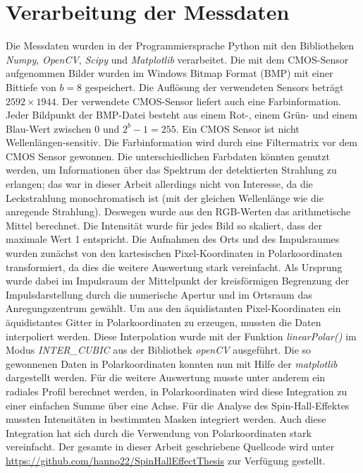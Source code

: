 \documentclass[a4paper, titlepage,  ngerman, fullpage]{book}
\begin{document}
	\section{Verarbeitung der Messdaten}
	\label{sec:polar_calculation}
	Die Messdaten wurden in der Programmiersprache Python mit den Bibliotheken \textit{Numpy}, \textit{OpenCV}, \textit{Scipy} und \textit{Matplotlib} verarbeitet. Die mit dem CMOS-Sensor aufgenommen Bilder wurden im Windows Bitmap Format (BMP) mit einer Bittiefe von  $b = 8$ gespeichert. Die Auflösung der verwendeten Sensors beträgt $2592 \times 1944$. Der verwendete CMOS-Sensor liefert auch eine Farbinformation. Jeder Bildpunkt der BMP-Datei besteht aus einem Rot-, einem Grün- und einem Blau-Wert zwischen $0$ und $2^b - 1= 255$. Ein CMOS Sensor ist nicht Wellenlängen-sensitiv. Die Farbinformation wird durch eine Filtermatrix vor dem CMOS Sensor gewonnen. Die unterschiedlichen Farbdaten könnten genutzt werden, um Informationen über das Spektrum der detektierten Strahlung zu erlangen; das war in dieser Arbeit allerdings nicht von Interesse, da die Leckstrahlung monochromatisch ist (mit der gleichen Wellenlänge wie die anregende Strahlung). Deswegen wurde aus den RGB-Werten das arithmetische Mittel berechnet. Die Intensität wurde für jedes Bild so skaliert, dass der maximale Wert 1 entspricht. Die Aufnahmen des Orts und des Impulsraumes wurden zunächst von den kartesischen Pixel-Koordinaten in Polarkoordinaten transformiert, da dies die weitere Auswertung stark vereinfacht. Als Ursprung wurde dabei im Impulsraum der Mittelpunkt der kreisförmigen Begrenzung der Impulsdarstellung durch die numerische Apertur und im Ortsraum das Anregungszentrum gewählt. Um aus den äquidistanten Pixel-Koordinaten ein äquidistantes Gitter in Polarkoordinaten zu erzeugen, mussten die Daten interpoliert werden. Diese Interpolation wurde mit der Funktion \textit{linearPolar()} im Modus \textit{INTER\_CUBIC} aus der Bibliothek \textit{openCV} ausgeführt. Die so gewonnenen Daten in Polarkoordinaten konnten nun mit Hilfe der \textit{matplotlib} dargestellt werden. Für die weitere Auswertung musste unter anderem ein radiales Profil berechnet werden, in Polarkoordinaten wird diese Integration zu einer einfachen Summe über eine Achse. Für die Analyse des Spin-Hall-Effektes mussten Intensitäten in bestimmten Masken integriert werden. Auch diese Integration hat sich durch die Verwendung von Polarkoordinaten stark vereinfacht. Der gesamte in dieser Arbeit geschriebene Quellcode wird unter \url{https://github.com/hanno22/SpinHallEffectThesis} zur Verfügung gestellt.
	\newpage
	
\end{document}
